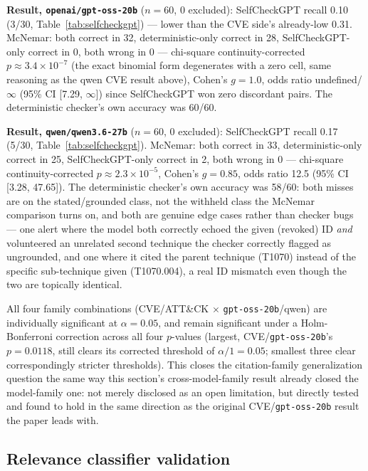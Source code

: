 \documentclass[pdflatex,sn-mathphys-num]{sn-jnl}%
\begin{document}
\textbf{Result, \texttt{openai/gpt-oss-20b}} ($n=60$, 0 excluded):
SelfCheckGPT recall 0.10 (3/30, Table~\ref{tab:selfcheckgpt}) --- lower
than the CVE side's already-low 0.31. McNemar: both correct in 32,
deterministic-only correct in 28, SelfCheckGPT-only correct in 0, both
wrong in 0 --- chi-square continuity-corrected $p\approx3.4\times10^{-7}$
(the exact binomial form degenerates with a zero cell, same reasoning as
the qwen CVE result above), Cohen's $g=1.0$, odds ratio
undefined/$\infty$ (95\% CI [7.29, $\infty$]) since SelfCheckGPT won zero
discordant pairs. The deterministic checker's own accuracy was 60/60.

\textbf{Result, \texttt{qwen/qwen3.6-27b}} ($n=60$, 0 excluded):
SelfCheckGPT recall 0.17 (5/30, Table~\ref{tab:selfcheckgpt}). McNemar:
both correct in 33, deterministic-only correct in 25, SelfCheckGPT-only
correct in 2, both wrong in 0 --- chi-square continuity-corrected
$p\approx2.3\times10^{-5}$, Cohen's $g=0.85$, odds ratio 12.5 (95\% CI
[3.28, 47.65]). The deterministic checker's own accuracy was 58/60: both
misses are on the stated/grounded class, not the withheld class the
McNemar comparison turns on, and both are genuine edge cases rather than
checker bugs --- one alert where the model both correctly echoed the
given (revoked) ID \textit{and} volunteered an unrelated second
technique the checker correctly flagged as ungrounded, and one where it
cited the parent technique (T1070) instead of the specific sub-technique
given (T1070.004), a real ID mismatch even though the two are topically
identical.

All four family combinations (CVE/ATT\&CK $\times$
\texttt{gpt-oss-20b}/qwen) are individually significant at
$\alpha=0.05$, and remain significant under a Holm-Bonferroni correction
across all four $p$-values (largest, CVE/\texttt{gpt-oss-20b}'s
$p=0.0118$, still clears its corrected threshold of $\alpha/1=0.05$;
smallest three clear correspondingly stricter thresholds). This closes
the citation-family generalization question the same way this section's
cross-model-family result already closed the model-family one: not
merely disclosed as an open limitation, but directly tested and found to
hold in the same direction as the original CVE/\texttt{gpt-oss-20b}
result the paper leads with.

\subsection{Relevance classifier validation}\label{subsec:relevance}
\end{document}

